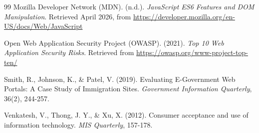 \documentclass[12pt, a4paper]{article}
\begin{document}
\begin{thebibliography}{99}
Mozilla Developer Network (MDN). (n.d.). \textit{JavaScript ES6 Features and DOM Manipulation}. Retrieved April 2026, from \url{https://developer.mozilla.org/en-US/docs/Web/JavaScript}

Open Web Application Security Project (OWASP). (2021). \textit{Top 10 Web Application Security Risks}. Retrieved from \url{https://owasp.org/www-project-top-ten/}

Smith, R., Johnson, K., \& Patel, V. (2019). Evaluating E-Government Web Portals: A Case Study of Immigration Sites. \textit{Government Information Quarterly}, 36(2), 244-257.

Venkatesh, V., Thong, J. Y., \& Xu, X. (2012). Consumer acceptance and use of information technology. \textit{MIS Quarterly}, 157-178.

\end{thebibliography}
\end{document}
